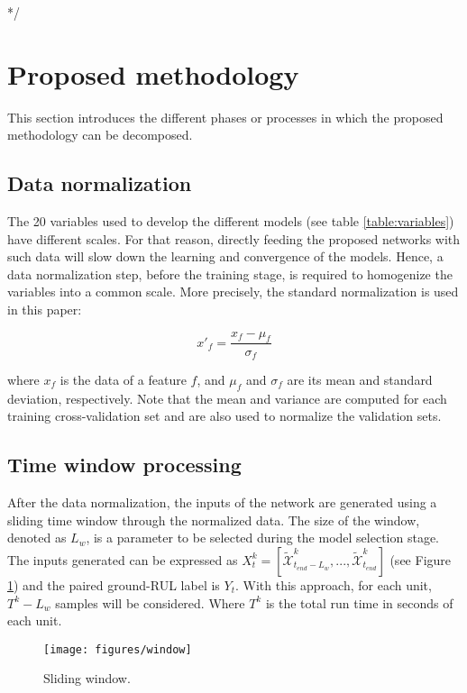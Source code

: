 \documentclass[PHM, 2021]{PHMSociety}
\begin{document}
*/

\section{Proposed methodology}

This section introduces the different phases or processes in which the proposed methodology can be decomposed.

\subsection{Data normalization}

The 20 variables used to develop the different models (see table \ref{table:variables}) have different scales. For that reason, directly feeding the proposed networks with such data will slow down the learning and convergence of the models. Hence, a data normalization step, before the training stage, is required to homogenize the variables into a common scale. More precisely, the standard normalization is used in this paper:

\begin{equation}
    x'_f = \frac{x_f - \mu_f}{\sigma_f}
\end{equation}

where $x_f$ is the data of a feature $f$, and $\mu_f$ and $\sigma_f$ are its mean and standard deviation, respectively. Note that the mean and variance are computed for each training cross-validation set and are also used to normalize the validation sets.

\subsection{Time window processing}

After the data normalization, the inputs of the network are generated using a sliding time window through the normalized data. The size of the window, denoted as $L_w$, is a parameter to be selected during the model selection stage. The inputs generated can be expressed as $X^k_t = [\widetilde{\mathcal{X}}^k_{t_{end} - L_w}, ..., \widetilde{\mathcal{X}}^k_{t_{end}}]$ (see Figure \ref{fig:window}) and the paired ground-RUL label is $Y_t$. With this approach, for each unit, $T^k - L_w$ samples will be considered. Where $T^k$ is the total run time in seconds of each unit.

\begin{figure}[t]
\centering
\texttt{[image: figures/window]}
\caption{Sliding window.}
\label{fig:window}
\end{figure}
\end{document}
